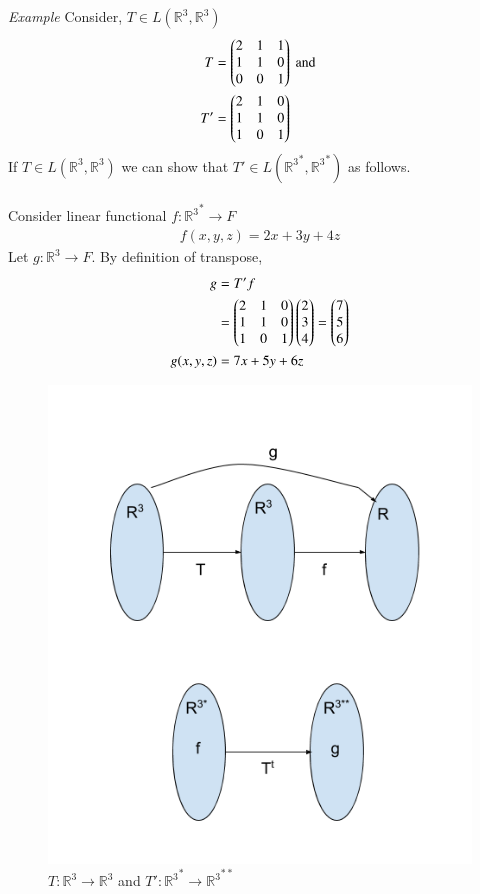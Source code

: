 
{\em Example}
Consider, $T \in L(\mathbb{R}^3,\mathbb{R}^3)$
\begin{align}
	T &= \begin{pmatrix}2 & 1 & 1\\ 1 & 1 & 0\\ 0 & 0 & 1\end{pmatrix} \text{ and }\\
	T' &= \begin{pmatrix}2 & 1 & 0\\1 & 1 & 0\\1 & 0 & 1\end{pmatrix}
\end{align}
If $T \in L(\mathbb{R}^3,\mathbb{R}^3)$ we can show that $T' \in L({\mathbb{R}^3}^*,{\mathbb{R}^3}^*)$ as follows.\\ 
\\Consider linear functional $f : {\mathbb{R}^3}^* \rightarrow F$ 
\begin{align}
	f(x,y,z) = 2x + 3y + 4z
\end{align}
Let $g : \mathbb{R}^3 \rightarrow F$. By definition of transpose,
\begin{align}
	g &= T'f\\
	&= \begin{pmatrix}2 & 1 & 0\\1 & 1 & 0\\1 & 0 & 1\end{pmatrix}\begin{pmatrix}2\\3\\4\end{pmatrix} = \begin{pmatrix}7\\5\\6\end{pmatrix}\\
	g(x,y,z) &= 7x + 5y + 6z
\end{align}
\begin{figure}[!ht]
\centering
\includegraphics[width=\columnwidth]{solutions/3/7/7/fig/transpose_example.png}
\caption{$T: \mathbb{R}^3 \rightarrow \mathbb{R}^3$ and $T': {\mathbb{R}^3}^* \rightarrow {\mathbb{R}^3}^{**}$}
\end{figure}
